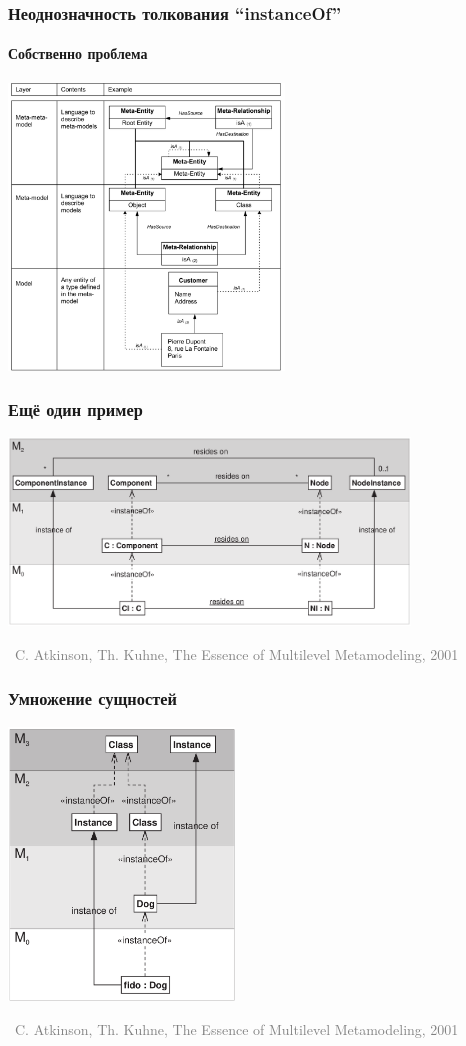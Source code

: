 \documentclass[xetex,mathserif,serif]{beamer}
\newcommand{\attribution}[1] {
\vspace{-5mm}\begin{flushright}\begin{scriptsize}\textcolor{gray}{\textcopyright\, #1}\end{scriptsize}\end{flushright}
}
\begin{document}
	\begin{frame}
		\frametitle{Неоднозначность толкования ``instanceOf''}
		\framesubtitle{Собственно проблема}
		\begin{center}
			\includegraphics[width=0.55\textwidth]{bezivinIsA.png}
		\end{center}
	\end{frame}

	\begin{frame}
		\frametitle{Ещё один пример}
		\begin{center}
			\includegraphics[width=0.8\textwidth]{atkinsonInstanceOf.png}
			\attribution{C. Atkinson, Th. Kuhne, The Essence of Multilevel Metamodeling, 2001}
		\end{center}
	\end{frame}

	\begin{frame}
		\frametitle{Умножение сущностей}
		\begin{center}
			\includegraphics[width=0.45\textwidth]{atkinsonDuplication.png}
			\attribution{C. Atkinson, Th. Kuhne, The Essence of Multilevel Metamodeling, 2001}
		\end{center}
	\end{frame}
\end{document}
